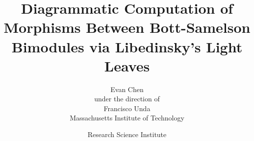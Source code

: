 

\title{
Diagrammatic Computation of Morphisms Between Bott-Samelson Bimodules via Libedinsky's Light Leaves
}

\author{
Evan Chen
\vspace{0.5in}\\
under the direction of\\
Francisco Unda\\
Massachusetts Institute of Technology
\vspace{1in}
}


\date{
Research Science Institute\\
\rsifinalpaperdate
}
